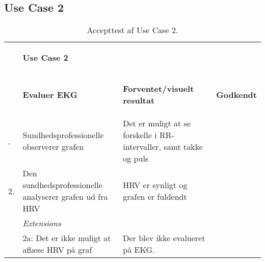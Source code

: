 \subsection{Use Case 2}

\begin{table}[H]
    \begin{tabularx}{\textwidth}{l X X c}
     \toprule
     ~ & \begin{large}\textbf{Use Case 2} \end{large} & ~ & ~ \\  
     ~ & \begin{large}\textbf{Evaluer EKG} \end{large}	  
     & \begin{large} \textbf{Forventet/visuelt resultat}\end{large} 
     & \begin{large} \textbf{Godkendt} \end{large}      
     \\     	 \midrule \addlinespace[3mm]                                                                                                                                                            
                         1. &  Sundhedsprofessionelle observerer grafen
     					    &  Det er muligt at se forskelle i RR-intervaller, samt takke og puls
     					    
     					    &  %
     					             \\	\midrule	
     					    
                         2. &  Den sundhedsprofessionelle analyserer grafen ud fra HRV
     					    &  HRV er synligt og grafen er fuldendt
     					    &  %
     					        \\ \midrule   
                         ~  &  \textit{Extensions}
     					    &  ~  
     					    &  ~         \\	\midrule
                         ~  &  2a: Det er ikke muligt at aflæse HRV på graf
     					    &  Der blev ikke evalueret på EKG. 
     					    &  %
     					    \\
    					         					         	
	\bottomrule   
    \end{tabularx}
    \caption {Accepttest af Use Case 2.}
    \label{tab:AT_UC1}
\end{table}
